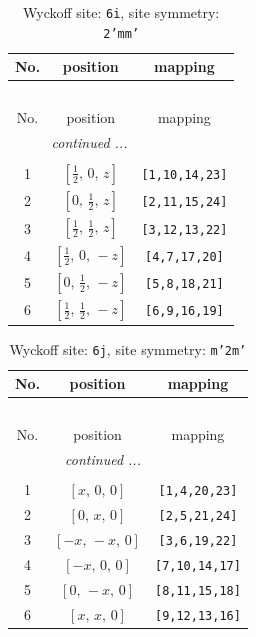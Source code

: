 \documentclass[fleqn,8pt]{jsarticle}
\begin{document}
\renewcommand{\arraystretch}{1.2}
\begin{longtable}{ccc}
\caption{Wyckoff site: {\tt 6i}, site symmetry: {\tt 2'mm'}}
 \\
 \hline \hline
No. & position & mapping \\ \hline \endfirsthead

\multicolumn{2}{l}{\tablename\ \thetable{}} \\
 \hline \hline
No. & position & mapping \\ \hline \endhead

 \hline \hline
\multicolumn{2}{r}{\footnotesize\it continued ...} \\ \endfoot

 \hline \hline
\multicolumn{2}{r}{} \\ \endlastfoot

1 & $\left[ \frac{1}{2},\, 0,\, z \right]$ & {\tt [1,10,14,23]} \\ \hline
2 & $\left[ 0,\, \frac{1}{2},\, z \right]$ & {\tt [2,11,15,24]} \\ \hline
3 & $\left[ \frac{1}{2},\, \frac{1}{2},\, z \right]$ & {\tt [3,12,13,22]} \\ \hline
4 & $\left[ \frac{1}{2},\, 0,\, - z \right]$ & {\tt [4,7,17,20]} \\ \hline
5 & $\left[ 0,\, \frac{1}{2},\, - z \right]$ & {\tt [5,8,18,21]} \\ \hline
6 & $\left[ \frac{1}{2},\, \frac{1}{2},\, - z \right]$ & {\tt [6,9,16,19]} \\
\end{longtable}
\renewcommand{\arraystretch}{1.2}
\begin{longtable}{ccc}
\caption{Wyckoff site: {\tt 6j}, site symmetry: {\tt m'2m'}}
 \\
 \hline \hline
No. & position & mapping \\ \hline \endfirsthead

\multicolumn{2}{l}{\tablename\ \thetable{}} \\
 \hline \hline
No. & position & mapping \\ \hline \endhead

 \hline \hline
\multicolumn{2}{r}{\footnotesize\it continued ...} \\ \endfoot

 \hline \hline
\multicolumn{2}{r}{} \\ \endlastfoot

1 & $\left[ x,\, 0,\, 0 \right]$ & {\tt [1,4,20,23]} \\ \hline
2 & $\left[ 0,\, x,\, 0 \right]$ & {\tt [2,5,21,24]} \\ \hline
3 & $\left[ - x,\, - x,\, 0 \right]$ & {\tt [3,6,19,22]} \\ \hline
4 & $\left[ - x,\, 0,\, 0 \right]$ & {\tt [7,10,14,17]} \\ \hline
5 & $\left[ 0,\, - x,\, 0 \right]$ & {\tt [8,11,15,18]} \\ \hline
6 & $\left[ x,\, x,\, 0 \right]$ & {\tt [9,12,13,16]} \\
\end{longtable}
\end{document}
